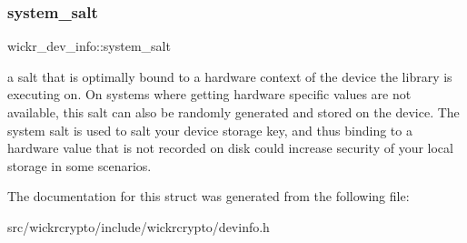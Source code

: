 \subsubsection{\texorpdfstring{system\_salt}{system\_salt}}
{\footnotesize\ttfamily wickr\+\_\+dev\+\_\+info\+::system\+\_\+salt}

a salt that is optimally bound to a hardware context of the device the library is executing on. On systems where getting hardware specific values are not available, this salt can also be randomly generated and stored on the device. The system salt is used to salt your device storage key, and thus binding to a hardware value that is not recorded on disk could increase security of your local storage in some scenarios. 

The documentation for this struct was generated from the following file\+:\begin{DoxyCompactItemize}
\item 
src/wickrcrypto/include/wickrcrypto/devinfo.\+h\end{DoxyCompactItemize}
